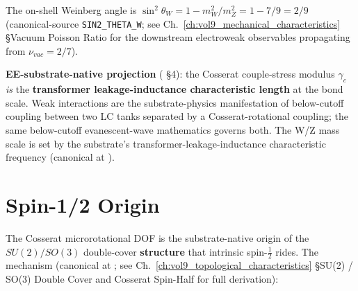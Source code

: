 The on-shell Weinberg angle is $\sin^2 \theta_W = 1 - m_W^2/m_Z^2 = 1 - 7/9 = 2/9$ (canonical-source  \texttt{SIN2\_THETA\_W}; see Ch.~\ref{ch:vol9_mechanical_characteristics} \S Vacuum Poisson Ratio for the downstream electroweak observables propagating from $\nu_{vac} = 2/7$).

\textbf{EE-substrate-native projection} ( \S 4): the Cosserat couple-stress modulus $\gamma_c$ \emph{is} the \textbf{transformer leakage-inductance characteristic length} at the bond scale. Weak interactions are the substrate-physics manifestation of below-cutoff coupling between two LC tanks separated by a Cosserat-rotational coupling; the same below-cutoff evanescent-wave mathematics governs both. The W/Z mass scale is set by the substrate's transformer-leakage-inductance characteristic frequency (canonical at ).

\section{Spin-1/2 Origin}
\label{sec:vol9_spin_half_origin}

The Cosserat microrotational DOF is the substrate-native origin of the $SU(2)/SO(3)$ double-cover \textbf{structure} that intrinsic spin-$\tfrac{1}{2}$ rides. The mechanism (canonical at ; see Ch.~\ref{ch:vol9_topological_characteristics} \S SU(2) / SO(3) Double Cover and Cosserat Spin-Half for full derivation):

